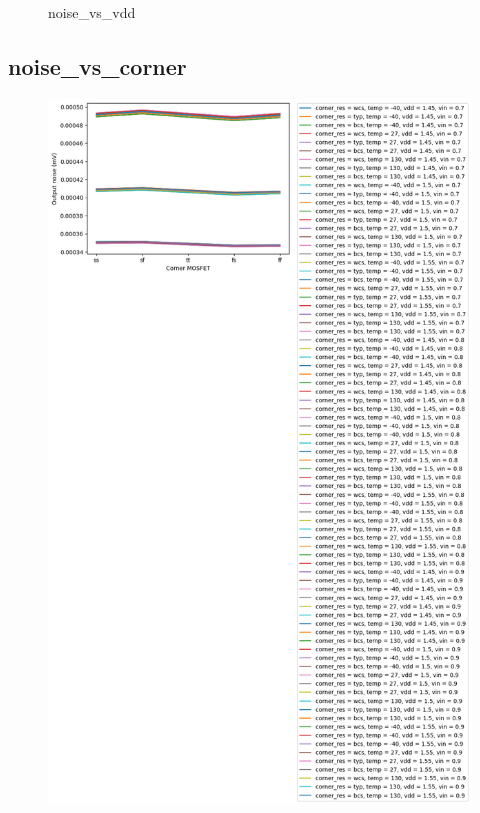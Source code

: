 \documentclass[
  a4paper,
  DIV=11,
  numbers=noendperiod]{scrartcl}
\begin{document}
\begin{tcolorbox}
\begin{figure}[H]
{}

\caption{noise\_vs\_vdd}

\end{figure}%

\subsection*{noise\_vs\_corner}\label{noise_vs_corner-1}

\begin{figure}[H]

{\centering \includegraphics{./cace/_docs/ota-improved/schematic/noise_vs_corner.png}

}
\end{figure}
\end{tcolorbox}
\end{document}
